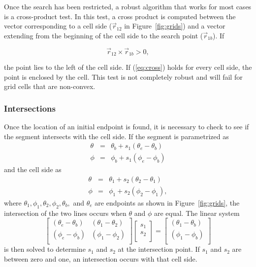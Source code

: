 \begin{description}
     Once the search has been restricted, a robust algorithm that works for most
     cases is a cross-product test.  In this test, a cross product is computed
     between the vector corresponding to a cell side ($\vec{r}_{12}$ in
     Figure~\ref{fig:grids}) and a vector extending from the beginning of the
     cell side to the search point ($\vec{r}_{1b}$).  If 

\begin{equation}\label{eq:cross}
\vec{r}_{12} \times \vec{r}_{1b} > 0,
\end{equation}

     the point lies to the left of the cell side.  If (\ref{eq:cross}) holds for
     every cell side, the point is enclosed by the cell.  This test is not
     completely robust and will fail for grid cells that are non-convex.

\subsubsection{Intersections}\label{sec:intersect}

     Once the location of an initial endpoint is found, it is necessary to check
     to see if the segment intersects with the cell side.  If the segment is
     parametrized as
\begin{eqnarray}
\theta &=& \theta_b + s_1 (\theta_e - \theta_b) \nonumber \\
\phi   &=& \phi_b + s_1 (\phi_e - \phi_b) 
\end{eqnarray}
     and the cell side as
\begin{eqnarray}
\theta &=& \theta_1 + s_2 (\theta_2 - \theta_1) \nonumber \\
\phi   &=& \phi_1 + s_2 (\phi_2 - \phi_1),
\end{eqnarray}
     where $\theta_1, \phi_1, \theta_2, \phi_2, \theta_b,$ and $\theta_e$ are
     endpoints as shown in Figure~\ref{fig:grids}, the intersection of the two
     lines occurs when $\theta$ and $\phi$ are equal.  The linear system 
\begin{equation}
\left[ \begin{array}{cc} 
(\theta_e - \theta_b) & (\theta_1 - \theta_2) \\
(\phi_e - \phi_b) & (\phi_1 - \phi_2) \\
\end{array} \right]
\left[ \begin{array}{c} s_1 \\ s_2 \\ \end{array} \right] = 
\left[ \begin{array}{c} 
(\theta_1 - \theta_b) \\ (\phi_1 - \phi_b)  \\
\end{array} \right]
\end{equation}
     is then solved to determine $s_1$ and $s_2$ at the intersection point.  If
     $s_1$ and $s_2$ are between zero and one, an intersection occurs with that
     cell side. 


\end{description}
